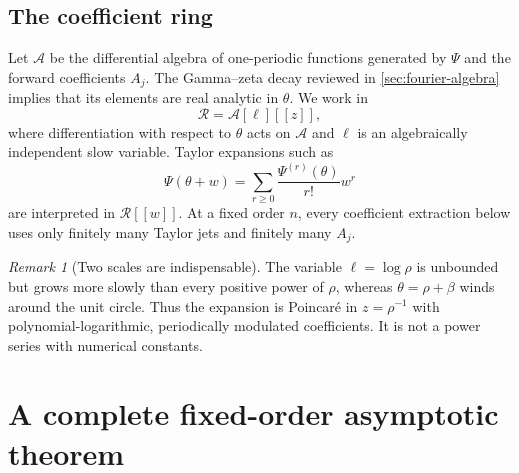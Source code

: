 \documentclass[11pt,oneside]{article}
\numberwithin{equation}{section}
\theoremstyle{definition}
\theoremstyle{remark}
\newtheorem{remark}[theorem]{Remark}
\begin{document}
\subsection{The coefficient ring}
Let $\mathscr A$ be the differential algebra of one-periodic functions generated by $\Psi$ and the forward coefficients $A_j$.  The Gamma--zeta decay reviewed in \cref{sec:fourier-algebra} implies that its elements are real analytic in $\theta$.  We work in
\begin{equation}
 \mathscr R=\mathscr A[\ell][[z]],
 \label{eq:ring}
\end{equation}
where differentiation with respect to $\theta$ acts on $\mathscr A$ and $\ell$ is an algebraically independent slow variable.  Taylor expansions such as
\begin{equation}
 \Psi(\theta+w)=\sum_{r\ge0}\frac{\Psi^{(r)}(\theta)}{r!}w^r
 \label{eq:Psi-Taylor}
\end{equation}
are interpreted in $\mathscr R[[w]]$.  At a fixed order $n$, every coefficient extraction below uses only finitely many Taylor jets and finitely many $A_j$.

\begin{remark}[Two scales are indispensable]
The variable $\ell=\log\rho$ is unbounded but grows more slowly than every positive power of $\rho$, whereas $\theta=\rho+\beta$ winds around the unit circle.  Thus the expansion is Poincar\'e in $z=\rho^{-1}$ with polynomial-logarithmic, periodically modulated coefficients.  It is not a power series with numerical constants.
\end{remark}

\section{A complete fixed-order asymptotic theorem}
\label{sec:main-theorem}
\end{document}
